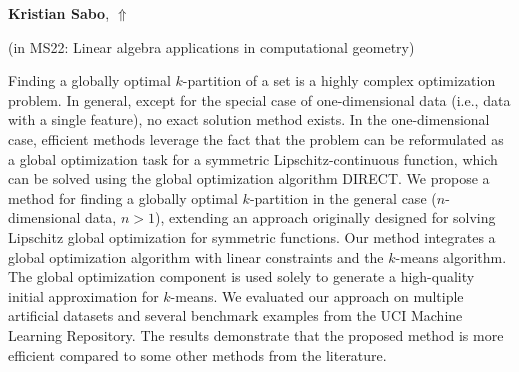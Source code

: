 \documentclass[ILAS2025-program.tex]{subfiles}
\begin{document}
\hypertarget{down0069}{}\begin{ilasabstract}
    
\textbf{Kristian Sabo},  \hfill \hyperlink{up0069}{$\Uparrow$}
    
    
(in {\color{mstitle}MS22: Linear algebra applications in computational geometry})
        
\mtskip
    Finding a globally optimal \( k \)-partition of a set is a highly complex optimization problem. In general, except for the special case of one-dimensional data (i.e., data with a single feature), no exact solution method exists. In the one-dimensional case, efficient methods leverage the fact that the problem can be reformulated as a global optimization task for a symmetric Lipschitz-continuous function, which can be solved using the global optimization algorithm DIRECT.   We propose a method for finding a globally optimal \( k \)-partition in the general case (\( n \)-dimensional data, \( n > 1 \)), extending an approach originally designed for solving Lipschitz global optimization for symmetric functions. Our method integrates a global optimization algorithm with linear constraints and the \( k \)-means algorithm. The global optimization component is used solely to generate a high-quality initial approximation for \( k \)-means.   We evaluated our approach on multiple artificial datasets and several benchmark examples from the UCI Machine Learning Repository. The results demonstrate that the proposed method is more efficient compared to some other methods from the literature. 
\end{ilasabstract}
    
\end{document}
